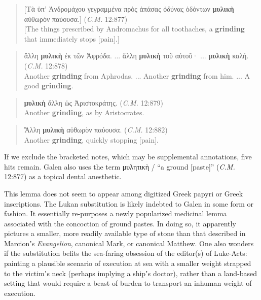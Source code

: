 \begin{quote}
[Τὰ ὑπ’ Ἀνδρομάχου γεγραμμένα πρὸς ἁπάσας ὀδύνας ὀδόντων %
\textbf{μυλικὴ} αὐθωρὸν παύουσα.] (\textit{C.M.} 12:877) \\[0.5mm]
[The things prescribed by Andromachus for all toothaches, %
a \textbf{grinding} that immediately stops [pain].]
\end{quote} %
\vspace*{1mm}

\begin{quote}
ἄλλη \textbf{μυλικὴ} ἐκ τῶν Ἀφρόδα. ... ἄλλη \textbf{μυλικὴ} τοῦ αὐτοῦ· ... %
\textbf{μυλικὴ} καλή. (\textit{C.M.} 12:878) \\[0.5mm]
Another \textbf{grinding} from Aphrodas. ... Another \textbf{grinding} from him. ... A good \textbf{grinding}. %
\end{quote} %
\vspace*{1mm}

\begin{quote}
\textbf{μυλικὴ} ἄλλη ὡς Ἀριστοκράτης. (\textit{C.M.} 12:879) \\[0.5mm]
Another \textbf{grinding}, as by Aristocrates.
\end{quote} %
\vspace*{1mm}

\begin{quote}
Ἄλλη \textbf{μυλικὴ} αὐθωρὸν παύουσα. (\textit{C.M.} 12:882) \\[0.5mm]
Another \textbf{grinding}, quickly stopping [pain].
\end{quote}
\vspace*{3mm}

\noindent{}If we exclude the bracketed notes, which may be supplemental annotations, %
five hits remain. Galen also uses the term μυλητικὴ / %
“a ground [paste]” (\textit{C.M.} 12:877) %
as a topical dental anesthetic.

This lemma does not seem to appear among digitized Greek papyri or Greek inscriptions. %
The Lukan substitution is likely indebted to Galen in some form or fashion. %
It essentially re-purposes a newly popularized medicinal lemma associated %
with the concoction of ground pastes. %
In doing so, it apparently pictures a smaller, more readily available type of stone %
than that described in Marcionʼs \textit{Evangelion}, canonical Mark, or canonical Matthew. %
One also wonders if the substitution befits the sea-faring obsession of the editor(s) %
of Luke-Acts: painting a plausible scenario of execution at sea with a smaller weight %
strapped to the victimʼs neck (perhaps implying a shipʼs doctor), %
rather than a land-based setting that would require a beast of burden to transport %
an inhuman weight of execution. %
%